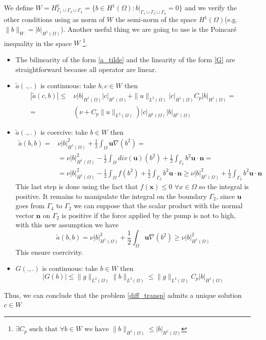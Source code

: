 \documentclass[]{report}
\begin{document}
We define $W=H^1_{\Gamma_1\cup\Gamma_3\cup\Gamma_4}=\{b\in H^1(\Omega):b|_{\Gamma_1\cup\Gamma_3\cup\Gamma_4}=0\}$ and we verify the other conditions using as norm of $W$ the semi-norm of the space $H^1(\Omega)$(e.g. $\|b\|_W=|b|_{H^1(\Omega)}$). Another useful thing we are going to use is the Poincar\'e inequality in the space $W$ \footnote{$\exists C_p \mbox{ such that }\forall b \in W \mbox{ we have } \|b\|_{H^1(\Omega)}\leq|b|_{H^1(\Omega)}$}.
\begin{itemize}
	\item The bilinearity of the form \eqref{a_tilde} and the linearity of the form \eqref{G} are straightforward because all operator are linear.
	\item $\tilde{a}(.,.)$ is continuous: take $b,c\in W$ then
	\begin{equation*}
	\begin{split}
	|\tilde{a}(c,b)|\leq& \nu |b|_{H^1(\Omega)}|c|_{H^1(\Omega)}+\|u\|_{L^2(\Omega)}|c|_{H^1(\Omega)}C_p|b|_{H^1(\Omega)}=\\
	=&(\nu+C_p\|u\|_{L^2(\Omega)})|c|_{H^1(\Omega)}|b|_{H^1(\Omega)}
	\end{split}
	\end{equation*}
	\item $\tilde{a}(.,.)$ is coercive: take $b\in W$ then
	\begin{equation*}
	\begin{split}
		\tilde{a}(b,b)=&\nu|b|_{H^1(\Omega)}^2+\frac{1}{2}\int_\Omega\mathbf{u}\nabla(b^2)=\\
		&=\nu|b|_{H^1(\Omega)}^2-\frac{1}{2}\int_\Omega div(\mathbf{u})(b^2)+\frac{1}{2}\int_{\Gamma_2}b^2\mathbf{u}\cdot\mathbf{n}=\\
		&=\nu|b|_{H^1(\Omega)}^2-\frac{1}{2}\int_\Omega f(b^2)+\frac{1}{2}\int_{\Gamma_2}b^2\mathbf{u}\cdot\mathbf{n} \geq \nu|b|_{H^1(\Omega)}^2+\frac{1}{2}\int_{\Gamma_2}b^2\mathbf{u}\cdot\mathbf{n}
	\end{split}
	\end{equation*}
	This last step is done using the fact that $f(\mathbf{x})\leq 0$ $ \forall x \in \Omega$ so the integral is positive. It remains to manipulate the integral on the boundary $\Gamma_2$, since $\mathbf{u}$ goes from $\Gamma_4$ to $\Gamma_2$ we can suppose that the scalar product with the normal vector $\mathbf{n}$ on $\Gamma_2$ is positive if the force applied by the pump is not to high, with this new assumption we have
	\begin{equation*}
			\tilde{a}(b,b)=\nu|b|_{H^1(\Omega)}^2+\frac{1}{2}\int_\Omega\mathbf{u}\nabla(b^2) \geq \nu|b|_{H^1(\Omega)}^2
	\end{equation*}
	This ensure coercivity.
	\item $G(.,.)$ is continuous: take $b\in W$ then
	\begin{equation*}
		|G(b)|\leq \|g\|_{L^2(\Omega)}\|b\|_{L^2(\Omega)}\leq\|g\|_{L^2(\Omega)}C_p|b|_{H^1(\Omega)}
	\end{equation*}
\end{itemize}
Thus, we can conclude that the problem \eqref{diff_transp} admits a unique solution $c\in W$
\end{document}
